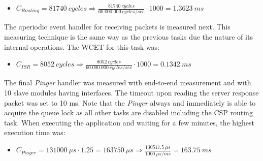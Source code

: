 \begin{itemize}
	\item $C_{Routing} = 81740\ cycles \Rightarrow \frac{81740\ cycles}{60.000.000\ cycles/sec} \cdot 1000 = 1.3623\ ms$
\end{itemize}

The aperiodic event handler for receiving packets is measured next. This measuring technique is the same way as the previous tasks due the nature of its internal operations. The WCET for this task was:

\begin{itemize}
	\item $C_{ISR} = 8052\ cycles \Rightarrow \frac{8052\ cycles}{60.000.000\ cycles/sec} \cdot 1000 = 0.1342\ ms$
\end{itemize}

The final \textit{Pinger} handler was measured with end-to-end measurement and with 10 slave modules having \iic interfaces. The timeout upon reading the server response packet was set to 10 ms. Note that the \textit{Pinger} always and immediately is able to acquire the queue lock as all other tasks are disabled including the CSP routing task. When executing the application and waiting for a few minutes, the highest execution time was:

\begin{itemize}
	\item $C_{Pinger} = 131000\ \mu s \cdot 1.25 = 163750\ \mu s \Rightarrow \frac{130517.5\ \mu s}{1000\ \mu s /ms} = 163.75\ ms$
\end{itemize}